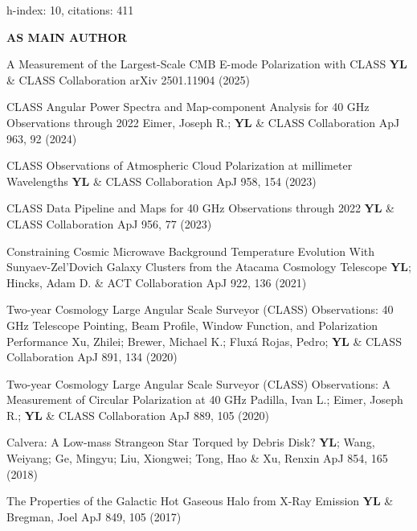 \hfill\textmd{h-index: 10, citations: 411}
\begin{footnotesize}
    \textsf{\textbf{ AS MAIN AUTHOR }}
\end{footnotesize}
\begin{etaremune}[topsep=0pt,itemsep=0pt,partopsep=0pt,parsep=0pt]
    \renewcommand\labelenumi{\footnotesize\bfseries\theenumi.}
    
            {A Measurement of the Largest-Scale CMB E-mode Polarization with CLASS}
            {\textbf{YL} \& CLASS Collaboration}
            {arXiv 2501.11904 (2025)}
    
            {CLASS Angular Power Spectra and Map-component Analysis for 40 GHz Observations through 2022}
            {Eimer, Joseph R.; \textbf{YL} \& CLASS Collaboration}
            {ApJ 963, 92 (2024)}
    
            {CLASS Observations of Atmospheric Cloud Polarization at millimeter Wavelengths}
            {\textbf{YL} \& CLASS Collaboration}
            {ApJ 958, 154 (2023)}
    
            {CLASS Data Pipeline and Maps for 40 GHz Observations through 2022}
            {\textbf{YL} \& CLASS Collaboration}
            {ApJ 956, 77 (2023)}
    
            {Constraining Cosmic Microwave Background Temperature Evolution With Sunyaev-Zel'Dovich Galaxy Clusters from the Atacama Cosmology Telescope}
            {\textbf{YL}; Hincks, Adam D. \& ACT Collaboration}
            {ApJ 922, 136 (2021)}
    
            {Two-year Cosmology Large Angular Scale Surveyor (CLASS) Observations: 40 GHz Telescope Pointing, Beam Profile, Window Function, and Polarization Performance}
            {Xu, Zhilei; Brewer, Michael K.; Fluxá Rojas, Pedro; \textbf{YL} \& CLASS Collaboration}
            {ApJ 891, 134 (2020)}
    
            {Two-year Cosmology Large Angular Scale Surveyor (CLASS) Observations: A Measurement of Circular Polarization at 40 GHz}
            {Padilla, Ivan L.; Eimer, Joseph R.; \textbf{YL} \& CLASS Collaboration}
            {ApJ 889, 105 (2020)}
    
            {Calvera: A Low-mass Strangeon Star Torqued by Debris Disk?}
            {\textbf{YL}; Wang, Weiyang; Ge, Mingyu; Liu, Xiongwei; Tong, Hao \& Xu, Renxin}
            {ApJ 854, 165 (2018)}
    
            {The Properties of the Galactic Hot Gaseous Halo from X-Ray Emission}
            {\textbf{YL} \& Bregman, Joel}
            {ApJ 849, 105 (2017)}
    
\end{etaremune}
